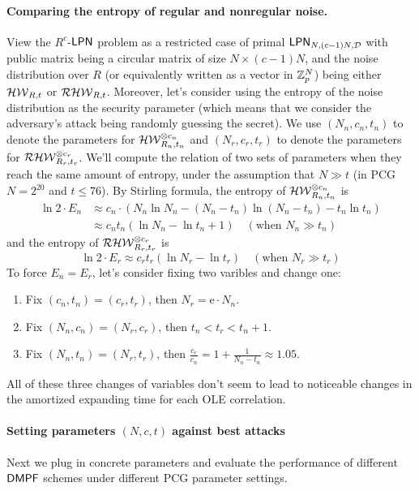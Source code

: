 \paragraph{Comparing the entropy of regular and nonregular noise.}View the $R^c$-${\sf LPN}$ problem as a restricted case of primal ${\sf LPN}_{N, (c-1)N, \mathcal{D}}$ with public matrix being a circular matrix of size $N\times (c-1)N$, and the noise distribution over $R$ (or equivalently written as a vector in $\mathbb{Z}_p^N$) being either $\mathcal{HW}_{R, t}$ or $\mathcal{RHW}_{R,t}$. Moreover, let's consider using the entropy of the noise distribution as the security parameter (which means that we consider the adversary's attack being randomly guessing the secret). We use $(N_n, c_n, t_n)$ to denote the parameters for $\mathcal{HW}^{\otimes c_n}_{R_n, t_n}$ and $(N_r, c_r, t_r)$ to denote the parameters for $\mathcal{RHW}^{\otimes c_r}_{R_r, t_r}$. We'll compute the relation of two sets of parameters when they reach the same amount of entropy, under the assumption that $N\gg t$ (in PCG $N = 2^{20}$ and $t\le 76$). By Stirling formula, the entropy of $\mathcal{HW}^{\otimes c_n}_{R_n, t_n}$ is 
\[
  \begin{split}
    \ln 2 \cdot E_n &\approx c_n\cdot \left(N_n\ln N_n - (N_n-t_n)\ln(N_n-t_n) - t_n\ln t_n\right) \\&\approx c_n t_n\left(\ln N_n - \ln t_n + 1\right) \quad(\text{when }N_n\gg t_n)
  \end{split}\]
and the entropy of $\mathcal{RHW}^{\otimes c_r}_{R_r, t_r}$ is 
\[
    \ln 2\cdot E_r \approx c_rt_r\left(\ln N_r - \ln t_r\right) \quad(\text{when }N_r\gg t_r)
\]
To force $E_n = E_r$, let's consider fixing two varibles and change one: 
\begin{enumerate}
  \item Fix $(c_n, t_n) = (c_r, t_r)$, then $N_r = \mathrm{e}\cdot N_n$. 
  \item Fix $(N_n, c_n) = (N_r, c_r)$, then $t_n<t_r<t_n+1$. 
  \item Fix $(N_n, t_n) = (N_r, t_r)$, then $\frac{c_r}{c_n} = 1 + \frac{1}{N_n - t_n}\approx 1.05$. 
\end{enumerate}
All of these three changes of variables don't seem to lead to noticeable changes in the amortized expanding time for each OLE correlation. 
\fi

\paragraph{Setting parameters $(N,c,t)$ against best attacks}Next we plug in concrete parameters and evaluate the performance of different ${\sf DMPF}$ schemes under different PCG parameter settings. 

